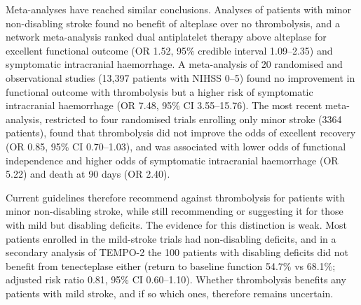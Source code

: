 Meta-analyses have reached similar conclusions. Analyses of patients with minor non-disabling stroke found no benefit of alteplase over no thrombolysis,\cite{alhazzani2024} and a network meta-analysis ranked dual antiplatelet therapy above alteplase for excellent functional outcome (OR 1.52, 95\% credible interval 1.09--2.35) and symptomatic intracranial haemorrhage.\cite{lun2025} A meta-analysis of 20 randomised and observational studies (13,397 patients with NIHSS 0--5) found no improvement in functional outcome with thrombolysis but a higher risk of symptomatic intracranial haemorrhage (OR 7.48, 95\% CI 3.55--15.76).\cite{zhang2024} The most recent meta-analysis, restricted to four randomised trials enrolling only minor stroke (3364 patients), found that thrombolysis did not improve the odds of excellent recovery (OR 0.85, 95\% CI 0.70--1.03), and was associated with lower odds of functional independence and higher odds of symptomatic intracranial haemorrhage (OR 5.22) and death at 90 days (OR 2.40).\cite{doheim2025}

Current guidelines therefore recommend against thrombolysis for patients with minor non-disabling stroke, while still recommending or suggesting it for those with mild but disabling deficits.\cite{powers2019,berge2021} The evidence for this distinction is weak. Most patients enrolled in the mild-stroke trials had non-disabling deficits, and in a secondary analysis of TEMPO-2 the 100 patients with disabling deficits did not benefit from tenecteplase either (return to baseline function 54.7\% vs 68.1\%; adjusted risk ratio 0.81, 95\% CI 0.60--1.10).\cite{zhang2025} Whether thrombolysis benefits any patients with mild stroke, and if so which ones, therefore remains uncertain.
